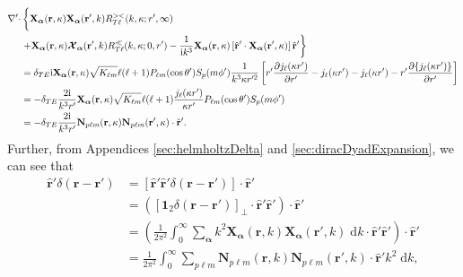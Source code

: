 \documentclass{article}
\begin{document}
\begin{equation}
\begin{split}
\nabla'\cdot&\left\{ \vphantom{\frac{1}{k^3}} \mathbf{X}_{\bm{\alpha}}(\mathbf{r},\kappa)\mathbf{X}_{\bm{\alpha}}(\mathbf{r}',k)R_{T\ell}^{><}(k,\kappa;r',\infty)\right.\\
&\left.+ \mathbf{X}_{\bm{\alpha}}(\mathbf{r},\kappa)\bm{\mathcal{X}}_{\bm{\alpha}}(\mathbf{r}',k)R_{T\ell}^\ll(k,\kappa;0,r') - \frac{1}{\mathrm{i}k^3}\mathbf{X}_{\bm{\alpha}}(\mathbf{r},\kappa)\left[\hat{\mathbf{r}}'\cdot\mathbf{X}_{\bm{\alpha}}(\mathbf{r}',\kappa)\right]\hat{\mathbf{r}}'\right\}\\
&= \delta_{TE}\mathrm{i}\mathbf{X}_{\bm{\alpha}}(\mathbf{r},\kappa)\sqrt{K_{\ell m}}\ell(\ell + 1)P_{\ell m}(\cos\theta')S_p(m\phi')\frac{1}{k^3\kappa r'^2}\left[r'\frac{\partial j_\ell(\kappa r')}{\partial r'} - j_\ell(\kappa r') - j_\ell(\kappa r') - r'\frac{\partial\{j_\ell(\kappa r')\}}{\partial r'}\right]\\
&= -\delta_{TE}\frac{2\mathrm{i}}{k^3r'}\mathbf{X}_{\bm{\alpha}}(\mathbf{r},\kappa)\sqrt{K_{\ell m}}\ell(\ell + 1)\frac{j_\ell(\kappa r')}{\kappa r'}P_{\ell m}(\cos\theta')S_p(m\phi')\\
&= -\delta_{TE}\frac{2\mathrm{i}}{k^3r'}\mathbf{N}_{p\ell m}(\mathbf{r},\kappa)\mathbf{N}_{p\ell m}(\mathbf{r}',\kappa)\cdot\hat{\mathbf{r}}'.
\end{split}
\end{equation}
Further, from Appendices \ref{sec:helmholtzDelta} and \ref{sec:diracDyadExpansion}, we can see that
\begin{equation}
\begin{split}
\hat{\mathbf{r}}'\delta(\mathbf{r} - \mathbf{r}') &= \left[\hat{\mathbf{r}}'\hat{\mathbf{r}}'\delta(\mathbf{r} - \mathbf{r}')\right]\cdot\hat{\mathbf{r}}'\\
&= \left(\left[\bm{1}_2\delta(\mathbf{r} - \mathbf{r}')\right]_\perp\cdot\hat{\mathbf{r}}'\hat{\mathbf{r}}'\right)\cdot\hat{\mathbf{r}}'\\
&= \left(\frac{1}{2\pi^2}\int_0^\infty\sum_{\bm{\alpha}}k^2\mathbf{X}_{\bm{\alpha}}(\mathbf{r},k)\mathbf{X}_{\bm{\alpha}}(\mathbf{r}',k)\;\mathrm{d}k\cdot\hat{\mathbf{r}}'\hat{\mathbf{r}}'\right)\cdot\hat{\mathbf{r}}'\\
&= \frac{1}{2\pi^2}\int_0^\infty\sum_{p\ell m}\mathbf{N}_{p\ell m}(\mathbf{r},k)\mathbf{N}_{p\ell m}(\mathbf{r}',k)\cdot\hat{\mathbf{r}}'k^2\;\mathrm{d}k,
\end{split}
\end{equation}
\end{document}
